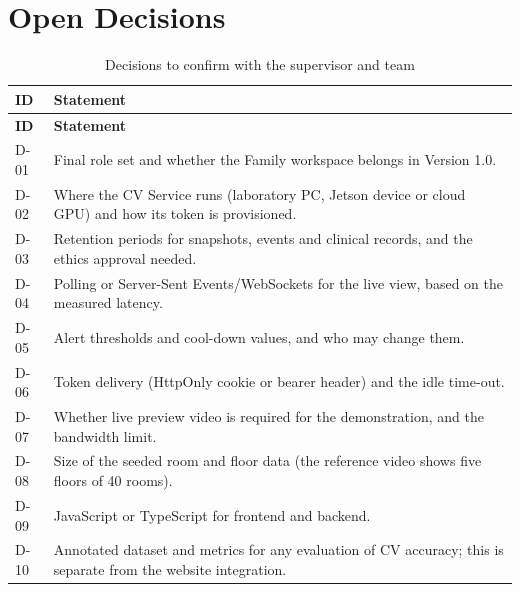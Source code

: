 \documentclass[a4paper,11pt]{scrreprt}
\makeatletter
\newenvironment{idtable}[1]{%
  \small
  \begin{longtable}{@{}>{\ttfamily\footnotesize}p{1.9cm}>{\raggedright\arraybackslash}p{13.2cm}@{}}
  \caption{#1}\\
  \toprule \textbf{ID} & \textbf{Statement}\\ \midrule
  \endfirsthead
  \toprule \textbf{ID} & \textbf{Statement}\\ \midrule
  \endhead
  \bottomrule
  \endfoot
}{%
  \end{longtable}\normalsize
}
\newcommand{\idr}[2]{#1 & #2 \\ \midrule}
\makeatother
\begin{document}
\chapter{Open Decisions}\label{app:open}
\begin{idtable}{Decisions to confirm with the supervisor and team}
\idr{D-01}{Final role set and whether the Family workspace belongs in Version 1.0.}
\idr{D-02}{Where the CV Service runs (laboratory PC, Jetson device or cloud GPU) and how its token is provisioned.}
\idr{D-03}{Retention periods for snapshots, events and clinical records, and the ethics approval needed.}
\idr{D-04}{Polling or Server-Sent Events/WebSockets for the live view, based on the measured latency.}
\idr{D-05}{Alert thresholds and cool-down values, and who may change them.}
\idr{D-06}{Token delivery (HttpOnly cookie or bearer header) and the idle time-out.}
\idr{D-07}{Whether live preview video is required for the demonstration, and the bandwidth limit.}
\idr{D-08}{Size of the seeded room and floor data (the reference video shows five floors of 40 rooms).}
\idr{D-09}{JavaScript or TypeScript for frontend and backend.}
\idr{D-10}{Annotated dataset and metrics for any evaluation of CV accuracy; this is separate from the website integration.}
\end{idtable}
\end{document}

